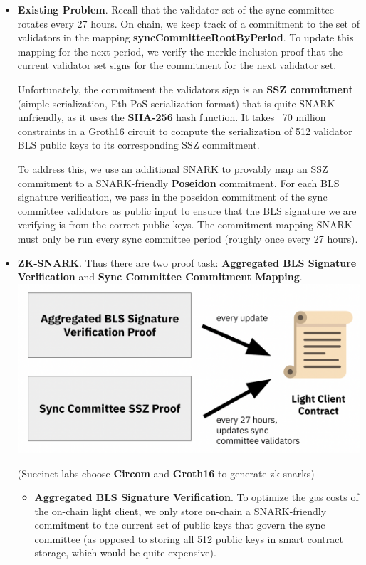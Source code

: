 \documentclass{article}
\begin{document}
\begin{itemize}
    \item \textbf{Existing Problem}. Recall that the validator set of the sync committee rotates every 27 hours. On chain, we keep track of a commitment to the set of validators in the mapping \textbf{syncCommitteeRootByPeriod}. To update this mapping for the next period, we verify the merkle inclusion proof that the current validator set signs for the commitment for the next validator set.


    Unfortunately, the commitment the validators sign is an \textbf{SSZ commitment} (simple serialization, Eth PoS serialization format) that is quite SNARK unfriendly, as it uses the \textbf{SHA-256} hash function. It takes ~70 million constraints in a Groth16 circuit to compute the serialization of 512 validator BLS public keys to its corresponding SSZ commitment. 
    
    To address this, we use an additional SNARK to provably map an SSZ commitment to a SNARK-friendly \textbf{Poseidon} commitment. For each BLS signature verification, we pass in the poseidon commitment of the sync committee validators as public input to ensure that the BLS signature we are verifying is from the correct public keys. The commitment mapping SNARK must only be run every sync committee period (roughly once every 27 hours).


    \item \textbf{ZK-SNARK}. Thus there are two proof task: \textbf{Aggregated BLS Signature Verification} and \textbf{Sync Committee Commitment Mapping}.
    \includegraphics[width=1\linewidth]{Z0J8h33.png}

    (Succinct labs choose \textbf{Circom} and \textbf{Groth16} to generate zk-snarks)
 
    \begin{itemize}
        \item \textbf{Aggregated BLS Signature Verification}. To optimize the gas costs of the on-chain light client, we only store on-chain a SNARK-friendly commitment to the current set of public keys that govern the sync committee (as opposed to storing all 512 public keys in smart contract storage, which would be quite expensive). 


\end{itemize}
\end{itemize}
\end{document}
